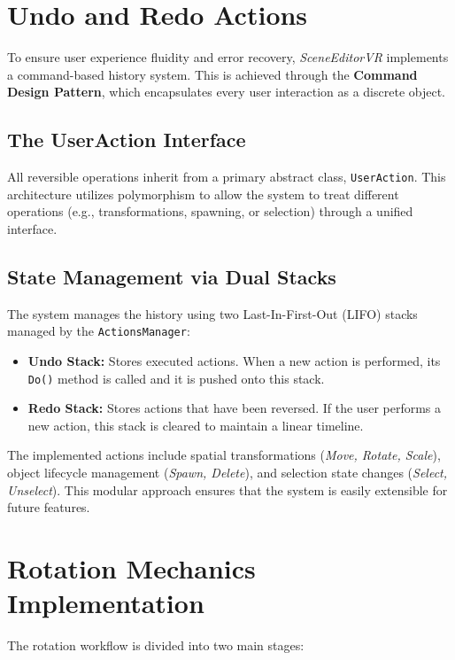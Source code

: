 \documentclass[inscr,ack,preface]{dithesis}
\begin{document}
\section{Undo and Redo Actions}

To ensure user experience fluidity and error recovery, \textit{SceneEditorVR}
implements a command-based history system. This is achieved through the \textbf{Command Design Pattern},
which encapsulates every user interaction as a discrete object.

\subsection{The UserAction Interface}
All reversible operations inherit from a primary abstract class, \texttt{UserAction}.
This architecture utilizes polymorphism to allow the system to treat different operations (e.g., transformations, spawning, or selection)
through a unified interface.

\subsection{State Management via Dual Stacks}
The system manages the history using two Last-In-First-Out (LIFO) stacks managed by the \texttt{ActionsManager}:

\begin{itemize}
  \item \textbf{Undo Stack:} Stores executed actions. When a new action is performed, its \texttt{Do()} method is called
        and it is pushed onto this stack.
  \item \textbf{Redo Stack:} Stores actions that have been reversed. If the user performs a new action,
        this stack is cleared to maintain a linear timeline.
\end{itemize}

The implemented actions include spatial transformations (\textit{Move, Rotate, Scale}), object lifecycle management (\textit{Spawn, Delete}),
and selection state changes (\textit{Select, Unselect}).
This modular approach ensures that the system is easily extensible for future features.

\section{Rotation Mechanics Implementation}

The rotation workflow is divided into two main stages:
\end{document}
